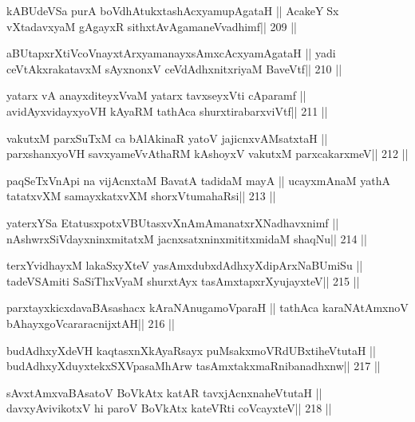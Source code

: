 \begin{shl}
kABUdeVSa purA boVdhAtukxtashAcxyamupAgataH ||
AcakeY$\;$Sx\,vXtadavxyaM gAgayxR sithxtAvAgamaneV\s vadhimf\hfill || 209 ||
\end{shl}

\begin{shl}
aBUtapxrXtiVcoV\s nayxtArxyamanayxsAmxcAcxyamAgataH ||
yadi ceVtAkxrakatavxM sAyxnonxV ceVdAdhxnitxriyaM BaveVtf\hfill || 210 ||
\end{shl}

\begin{shl}
yatarx vA anayxditeyxVvaM yatarx tavxseyxVti cAparamf ||
avidAyxvidayxyoVH kAyaRM tathAca shurxtirabarxviVtf\hfill || 211 ||
\end{shl}

\begin{shl}
vakutxM parxSuTxM ca bAlAkinaR yatoV jajicnxvAMsatxtaH ||
parxshanxyoVH savxyameVvAthaRM kAshoyxV vakutxM parxcakarxmeV\hfill || 212 ||
\end{shl}

\begin{shl}
paqSeTxVnApi na vijAcnxtaM BavatA tadidaM mayA ||
ucayxmAnaM yathA tatatxvXM samayxkatxvXM shorxVtumahaRsi\hfill || 213 ||
\end{shl}

\begin{shl}
yaterxYSa EtatusxpotxV\s BUtasxvXnAmAmanatxrXNadhavxnimf ||
nAshwrxSiVdayxninxmitatxM jacnxsatxninxmititxmidaM shaqNu\hfill || 214 ||
\end{shl}

\begin{shl}
terxYvidhayxM lakaSxyXteV yasAmxdubxdAdhxyXdipArxNaBUmiSu ||
tadeVSAmiti SaSiThxVyaM shurxtAyx tasAmxtapxrXyujayxteV\hfill || 215 ||
\end{shl}

\begin{shl}
parxtayxkicxdavaBAsashacx kAraNAnugamoV\s paraH ||
tathAca karaNAtAmxnoV bAhayxgoVcararacnijxtAH\hfill || 216 ||
\end{shl}

\begin{shl}
budAdhxyXdeVH kaqtasxnXkAyaRsayx puMsakxmoVRdUBxtiheVtutaH ||
budAdhxyXduyxtekxSXVpasaMhArw tasAmxtakxmaRnibanadhxnw\hfill || 217 ||
\end{shl}

\begin{shl}
sAvxtAmxvaBAsatoV BoVkAtx katAR tavxjAcnxnaheVtutaH ||
davxyAvivikotxV hi paroV BoVkAtx kateVRti coVcayxteV\hfill || 218 ||
\end{shl}

